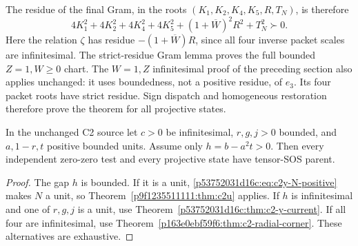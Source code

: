 The residue of the final Gram, in the roots
$(K_1,K_2,K_4,K_5,R,T_N)$, is therefore
\begin{equation}
4K_1^2+4K_2^2+4K_4^2+4K_5^2
 +(1+\overline W)^2R^2+T_N^2\succ0.
\label{p163e0ebf59f6:eq:c2r-strict-residue}
\end{equation}
Here the relation $\zeta$ has residue $-(1+\overline W)R$, since all
four inverse packet scales are infinitesimal.  The strict-residue Gram
lemma proves the full bounded $Z=1,W\geq0$ chart.  The $W=1,Z$
infinitesimal proof of the preceding section also applies unchanged:
it uses boundedness, not a positive residue, of $e_3$.  Its four packet
roots have strict residue.  Sign dispatch and homogeneous restoration
therefore prove the theorem for all projective states.

\begin{corollary}
\label{p163e0ebf59f6:cor:c2-bounded-shape}
In the unchanged C2 source let $c>0$ be infinitesimal, $r,g,j>0$
bounded, and $a,1-r,t$ positive bounded units.  Assume only
$h=b-a^2t>0$.  Then every independent zero-zero test and every projective
state have tensor-SOS parent.
\end{corollary}
\begin{proof}
The gap $h$ is bounded.  If it is a unit,
\eqref{p53752031d16c:eq:c2y-N-positive} makes $N$ a unit, so Theorem~\ref{p9f1235511111:thm:c2u}
applies.  If $h$ is infinitesimal and one of $r,g,j$ is a unit, use
Theorem~\ref{p53752031d16c:thm:c2-y-current}.  If all four are infinitesimal, use
Theorem~\ref{p163e0ebf59f6:thm:c2-radial-corner}.  These alternatives are exhaustive.
\end{proof}
